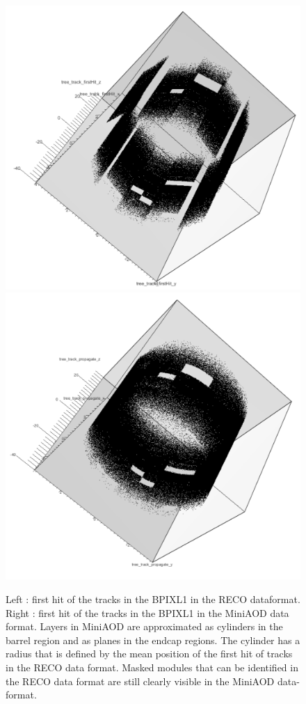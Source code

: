 \documentclass{cernatlasnote}
\begin{document}
\begin{figure}
    \centering
    \includegraphics[width=0.5\linewidth]{images/FirstHit/BPIXL1RECO2018.pdf}\includegraphics[width=0.5\linewidth]{images/FirstHit/BPIXL1PROPA2018.pdf}
    \caption{Left : first hit of the tracks in the BPIXL1 in the RECO dataformat. Right : first hit of the tracks in the BPIXL1 in the MiniAOD data format. Layers in MiniAOD are approximated as cylinders in the barrel region and as planes in the endcap regions. The cylinder has a radius that is defined by the mean position of the first hit of tracks in the RECO data format. Masked modules that can be identified in the RECO data format are still clearly visible in the MiniAOD data-format.}
    \label{fig:BPIXL1PROPA}
\end{figure}
\end{document}
